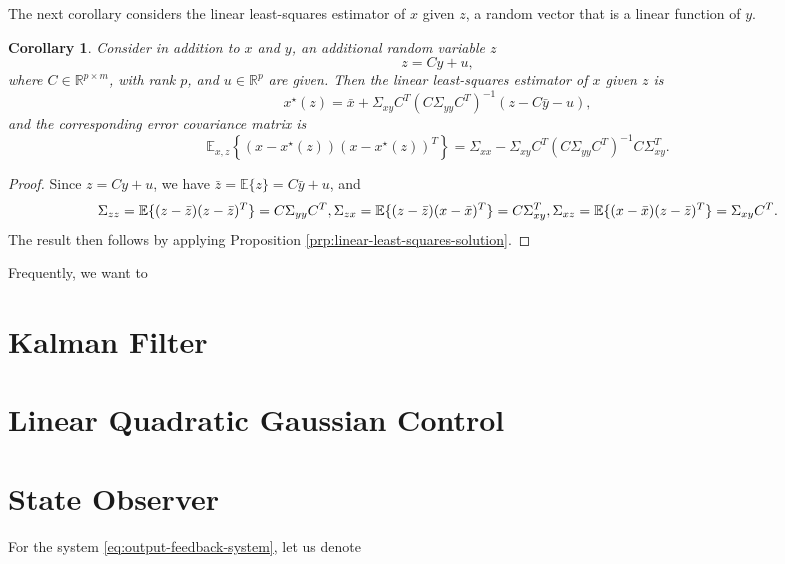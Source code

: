 \documentclass[
]{book}
\newtheorem{corollary}{Corollary}[chapter]
\theoremstyle{definition}
\theoremstyle{definition}
\theoremstyle{definition}
\theoremstyle{definition}
\theoremstyle{remark}
\begin{document}
The next corollary considers the linear least-squares estimator of \(x\) given \(z\), a random vector that is a linear function of \(y\).

\begin{corollary}
\protect\hypertarget{cor:linear-least-squares-x-z}{}\label{cor:linear-least-squares-x-z}Consider in addition to \(x\) and \(y\), an additional random variable \(z\)
\[
z = C y + u,
\]
where \(C \in \mathbb{R}^{p \times m}\), with rank \(p\), and \(u \in \mathbb{R}^p\) are given. Then the linear least-squares estimator of \(x\) given \(z\) is
\[
x^\star(z) = \bar{x} + \Sigma_{xy} C^T (C \Sigma_{yy} C^T)^{-1} (z - C \bar{y} - u),
\]
and the corresponding error covariance matrix is
\[
\mathbb{E}_{x,z}\left\{ (x - x^\star(z))(x - x^\star(z))^T \right\} = \Sigma_{xx} - \Sigma_{xy} C^T (C \Sigma_{yy} C^T)^{-1} C \Sigma_{xy}^T.
\]
\end{corollary}

\begin{proof}
Since \(z = Cy + u\), we have \(\bar{z} = \mathbb{E}\{ z \} = C \bar{y} + u\), and
\[
\Sigma_{zz} = \mathbb{E}\{ (z - \bar{z})(z - \bar{z})^T \} = C \Sigma_{yy} C^T, \\
\Sigma_{zx} = \mathbb{E}\{ (z - \bar{z})(x - \bar{x})^T \} = C \Sigma_{xy}^T, \\
\Sigma_{xz} = \mathbb{E}\{ (x - \bar{x})(z - \bar{z})^T \} = \Sigma_{xy}C^T.
\]
The result then follows by applying Proposition \ref{prp:linear-least-squares-solution}.
\end{proof}

Frequently, we want to

\hypertarget{kalman-filter}{%
\section{Kalman Filter}\label{kalman-filter}}

\hypertarget{linear-quadratic-gaussian-control}{%
\section{Linear Quadratic Gaussian Control}\label{linear-quadratic-gaussian-control}}

\hypertarget{state-observer}{%
\section{State Observer}\label{state-observer}}

For the system \eqref{eq:output-feedback-system}, let us denote
\end{document}
